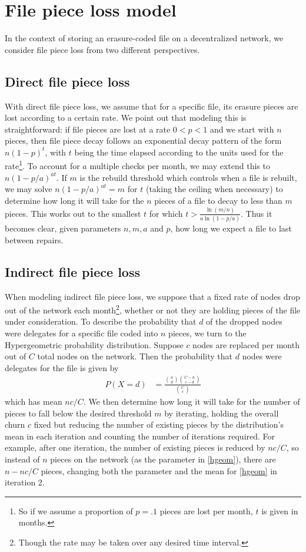 \section{File piece loss model}
\linespread{2.0}

In the context of storing an erasure-coded file on a decentralized network, we consider file piece loss from two different perspectives.

\subsection{Direct file piece loss}
With direct file piece loss, we assume that for a specific file, its erasure pieces are lost according to a certain rate. We point out that modeling this is straightforward: if file pieces are lost at a rate $0<p<1$ and we start with $n$ pieces, then file piece decay follows an exponential decay pattern of the form $n(1-p)^t$, with $t$ being the time elapsed according to the units used for the rate\footnote{So if we assume a proportion of $p=.1$ pieces are lost per month, $t$ is given in months.}.
To account for $a$ multiple checks per month, we may extend this to $n(1-p/a)^{at}$. If $m$ is the rebuild threshold which controls when a file is rebuilt, we may solve $n(1-p/a)^{at}=m$ for $t$ (taking the ceiling when necessary) to determine how long it will take for the $n$ pieces of a file to decay to less than $m$ pieces. This works out to the smallest $t$ for which
$t>\frac{\ln(m/n)}{a\ln(1-p/a)}$. Thus it becomes clear, given parameters $n,m,a$ and $p$, how long we expect a file to last between repairs.

\subsection{Indirect file piece loss}

When modeling indirect file piece loss, we suppose that a fixed rate of nodes
drop out of the network each month\footnote{Though the rate may be taken over
any desired time interval.}, whether or not they are holding pieces of the file
under consideration. To describe the probability that $d$ of the dropped nodes
were delegates for a specific file coded into $n$ pieces, we turn to the
Hypergeometric probability distribution. Suppose $c$ nodes are replaced per
month out of $C$ total nodes on the network. Then the probability that $d$
nodes were delegates for the file is given by
\begin{align}
    P(X=d)&=\frac{\binom{n}{d}\binom{C-n}{c-d}}{\binom{C}{c}}\label{hgeom}
\end{align}
which has mean $nc/C$. We then determine how long it will take for the number of pieces to fall below the desired threshold $m$ by iterating, holding the overall churn $c$ fixed but reducing the number of existing pieces by the distribution's mean in each iteration and counting the number of iterations required. For example, after one iteration, the number of existing pieces is reduced by $nc/C$, so instead of $n$ pieces on the network (as the parameter in \eqref{hgeom}), there are $n-nc/C$ pieces, changing both the parameter and the mean for \eqref{hgeom} in iteration 2.


